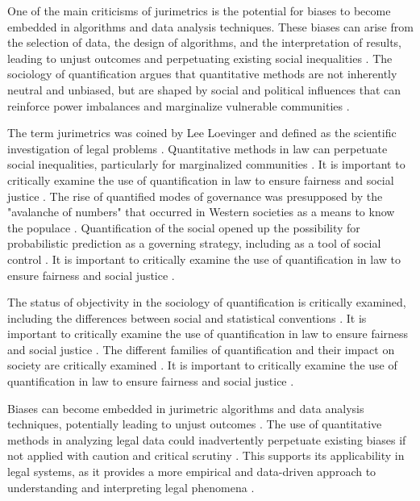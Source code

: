 One of the main criticisms of jurimetrics is the potential for biases to become embedded in algorithms and data analysis techniques. These biases can arise from the selection of data, the design of algorithms, and the interpretation of results, leading to unjust outcomes and perpetuating existing social inequalities \cite{10.1590/data.2022.65.3.267,loevinger1959}. The sociology of quantification argues that quantitative methods are not inherently neutral and unbiased, but are shaped by social and political influences that can reinforce power imbalances and marginalize vulnerable communities \cite{10.1590/data.2022.65.3.267,loevinger1959}.

The term jurimetrics was coined by Lee Loevinger and defined as the scientific investigation of legal problems \cite{ribeiro2021quantification}. Quantitative methods in law can perpetuate social inequalities, particularly for marginalized communities \cite{ribeiro2021quantification}. It is important to critically examine the use of quantification in law to ensure fairness and social justice \cite{ribeiro2021quantification}. The rise of quantified modes of governance was presupposed by the "avalanche of numbers" that occurred in Western societies as a means to know the populace \cite{101111lsi_12334}. Quantification of the social opened up the possibility for probabilistic prediction as a governing strategy, including as a tool of social control \cite{101111lsi_12334}. It is important to critically examine the use of quantification in law to ensure fairness and social justice \cite{101111lsi_12334}.

The status of objectivity in the sociology of quantification is critically examined, including the differences between social and statistical conventions \cite{salais2016}. It is important to critically examine the use of quantification in law to ensure fairness and social justice \cite{salais2016}. The different families of quantification and their impact on society are critically examined \cite{101007s1102402209481_w}. It is important to critically examine the use of quantification in law to ensure fairness and social justice \cite{101007s1102402209481_w}.

Biases can become embedded in jurimetric algorithms and data analysis techniques, potentially leading to unjust outcomes \cite{10.1057/s41599-020-00557-0,10.5040/9781350220645}. The use of quantitative methods in analyzing legal data could inadvertently perpetuate existing biases if not applied with caution and critical scrutiny \cite{10.1057/s41599-020-00557-0,10.5040/9781350220645}. This supports its applicability in legal systems, as it provides a more empirical and data-driven approach to understanding and interpreting legal phenomena \cite{10.1057/s41599-020-00557-0,10.5040/9781350220645}.


